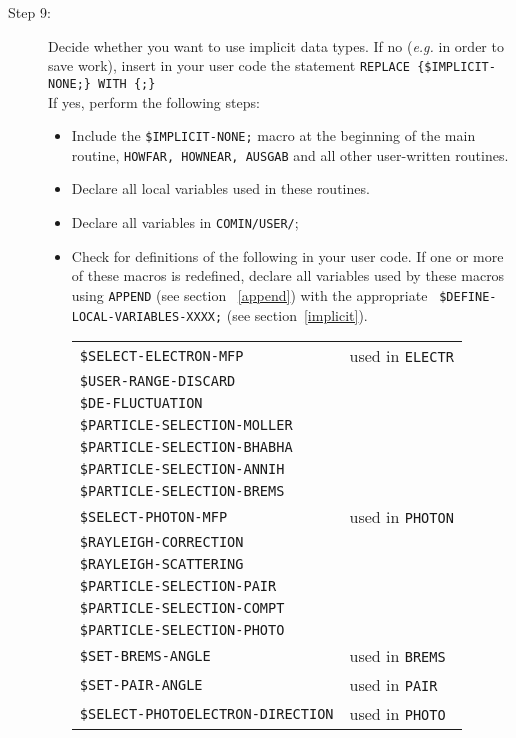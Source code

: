 \begin{description}
\item[Step 9:]
Decide whether you want to use implicit data types.
If no ({\em e.g.} in order to save work), insert in
your user code the statement
{\tt REPLACE \{\$IMPLICIT-NONE;\} WITH \{;\} }\\
If yes, perform the following steps:
\begin{itemize}
\item
Include the {\tt \$IMPLICIT-NONE;} macro at the beginning
of the main routine, {\tt HOWFAR, HOWNEAR, AUSGAB} and
all other user-written routines.
\item
Declare all local variables used in these routines.
\item
Declare all variables in {\tt COMIN/USER/};
\item
Check for definitions of the following
in your user code. If one or more of these macros is redefined,
declare all variables used by these macros using {\tt APPEND}
(see section ~\ref{append}) with the appropriate {\tt
\$DEFINE-LOCAL-VARIABLES-XXXX;} (see section~\ref{implicit}).\\
\begin{tabular}{ll}
{\tt \$SELECT-ELECTRON-MFP}  &  used in {\tt ELECTR} \\
{\tt \$USER-RANGE-DISCARD} & \\
{\tt \$DE-FLUCTUATION} & \\
{\tt \$PARTICLE-SELECTION-MOLLER} & \\
{\tt \$PARTICLE-SELECTION-BHABHA} & \\
{\tt \$PARTICLE-SELECTION-ANNIH} & \\
{\tt \$PARTICLE-SELECTION-BREMS} & \\
{\tt \$SELECT-PHOTON-MFP} & used in {\tt PHOTON}\\
{\tt \$RAYLEIGH-CORRECTION} & \\
{\tt \$RAYLEIGH-SCATTERING} & \\
{\tt \$PARTICLE-SELECTION-PAIR} & \\
{\tt \$PARTICLE-SELECTION-COMPT} & \\
{\tt \$PARTICLE-SELECTION-PHOTO} & \\
{\tt \$SET-BREMS-ANGLE} & used in {\tt BREMS} \\
{\tt \$SET-PAIR-ANGLE} & used in {\tt PAIR} \\
{\tt \$SELECT-PHOTOELECTRON-DIRECTION} & used in {\tt PHOTO} \\
\end{tabular}
\end{itemize}


\end{description}
